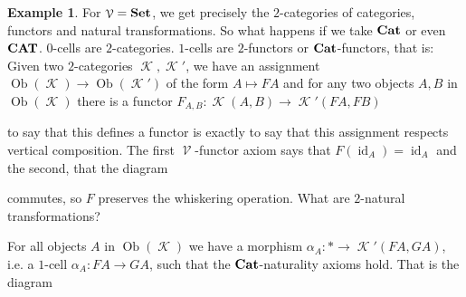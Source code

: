 \documentclass[a4paper,11pt,oneside,openany]{scrbook}
\newcommand{\catname}[1]{{\normalfont\textbf{#1}}}
\newcommand{\Set}{\catname{Set}}
\newcommand{\Cat}{\catname{Cat}}
\newcommand{\CAT}{\catname{CAT}}
\newcommand{\from}{\colon}
\DeclareMathOperator{\K}{\mathcal{K}}
\DeclareMathOperator{\V}{\mathcal{V}}
\DeclareMathOperator{\id}{id}
\DeclareMathOperator{\Ob}{Ob}
\theoremstyle{definition}
\theoremstyle{definition}
\newtheorem{exmp}[thm]{Example}
\begin{document}
\begin{exmp}
   For $\V=\Set$, we get precisely the $2$-categories of categories, functors and natural transformations. So what happens if we take $\Cat$ or even $\CAT$. 
   $0$-cells are $2$-categories. $1$-cells are $2$-functors or $\Cat$-functors, that is: Given two $2$-categories $\K,\K'$, we have an assignment 
   $\Ob(\K) \to \Ob(\K')$ of the form $A \mapsto FA$ and for any two objects $A,B$ in $\Ob(\K)$ there is a functor $F_{A,B} \from \K(A,B) \to \K'(FA,FB)$
      \begin{center}
      \end{center}
    to say that this defines a functor is exactly to say that this assignment respects vertical composition. The first $\V$-functor axiom says that $F(\id_{A}) =\id_{A}$
    and the second, that the diagram 
       \begin{center}
       \end{center}
    commutes, so $F$ preserves the whiskering operation. What are $2$-natural transformations?
       \begin{center}
       \end{center}
    For all objects $A$ in $\Ob(\K)$ we have a morphism $\alpha_{A} \from \ast \to \K'(FA,GA)$, i.e. a $1$-cell $\alpha_{A} \from FA \to GA$, such that
    the $\Cat$-naturality axioms hold. That is the diagram 
       \begin{center}
\end{center}
\end{exmp}
\end{document}
